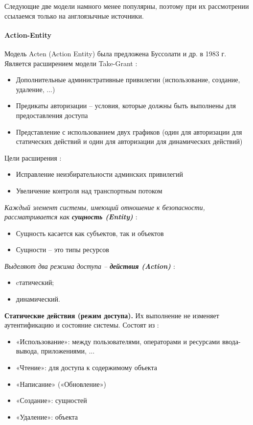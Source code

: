 Следующие две модели намного менее популярны, поэтому при их рассмотрении ссылаемся только на англоязычные 
источники.

\paragraph{Action-Entity}

Модель Acten (Action Entity) была предложена Буссолати и др. \autocite{Jalili} в 1983 г. Является расширением 
модели Take-Grant \autocite{SecModels}:
\begin{itemize}
    \item Дополнительные административные привилегии (использование, создание, удаление, ...)
    \item Предикаты авторизации -- условия, которые должны быть выполнены для предоставления доступа
    \item Представление с использованием двух графиков (один для авторизации для статических действий и один 
    для авторизации для динамических действий)
\end{itemize}
Цели расширения \autocite{Jalili}:
\begin{itemize}
    \item Исправление неизбирательности админских привилегий
    \item Увеличение контроля над транспортным потоком
\end{itemize}

\textit{Каждый элемент системы, имеющий отношение к безопасности, рассматривается как \textbf{сущность (Entity)} \autocite{Jalili}}:
\begin{itemize}
    \item Сущность касается как субъектов, так и объектов
    \item Сущности -- это типы ресурсов
\end{itemize}

\textit{Выделяют два режима доступа -- \textbf{действия (Action)} \autocite{Jalili}}:
\begin{itemize}
    \item cтатический;
    \item динамический.
\end{itemize}

\textbf{Статические действия (режим доступа).} Их выполнение не изменяет аутентификацию и состояние системы.
Состоят из \autocite{SecModels}:
\begin{itemize}
    \item «Использование»: между пользователями, операторами и ресурсами ввода-вывода, приложениями, ...
    \item «Чтение»: для доступа к содержимому объекта
    \item «Написание» («Обновление»)
    \item «Создание»: сущностей
    \item «Удаление»: объекта
\end{itemize}

